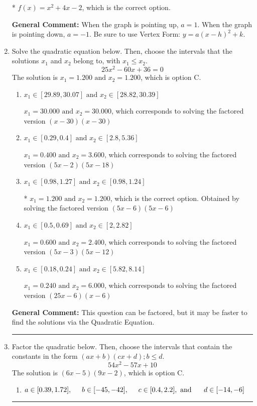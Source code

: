 \documentclass{extbook}[14pt]
\newcommand{\litem}[1]{\item #1

\rule{\textwidth}{0.4pt}}
\begin{document}
\begin{enumerate}
{\begin{enumerate}[label=\Alph*.]
* $f(x)=x^{2} +4 x -2$, which is the correct option.
\end{enumerate}

\textbf{General Comment:} When the graph is pointing up, $a=1$. When the graph is pointing down, $a=-1$. Be sure to use Vertex Form: $y = a(x-h)^2+k$.
}
\litem{
Solve the quadratic equation below. Then, choose the intervals that the solutions $x_1$ and $x_2$ belong to, with $x_1 \leq x_2$.
\[ 25x^{2} -60 x + 36 = 0 \]The solution is \( x_1 = 1.200 \text{ and } x_2 = 1.200 \), which is option C.\begin{enumerate}[label=\Alph*.]
\item \( x_1 \in [29.89, 30.07] \text{ and } x_2 \in [28.82, 30.39] \)

$x_1 = 30.000 \text{ and } x_2 = 30.000$, which corresponds to solving the factored version $(x -30)(x -30)$
\item \( x_1 \in [0.29, 0.4] \text{ and } x_2 \in [2.8, 5.36] \)

$x_1 = 0.400 \text{ and } x_2 = 3.600$, which corresponds to solving the factored version $(5x -2)(5x -18)$
\item \( x_1 \in [0.98, 1.27] \text{ and } x_2 \in [0.98, 1.24] \)

* $x_1 = 1.200 \text{ and } x_2 = 1.200$, which is the correct option. Obtained by solving the factored version $(5x -6)(5x -6)$
\item \( x_1 \in [0.5, 0.69] \text{ and } x_2 \in [2, 2.82] \)

$x_1 = 0.600 \text{ and } x_2 = 2.400$, which corresponds to solving the factored version $(5x -3)(5x -12)$
\item \( x_1 \in [0.18, 0.24] \text{ and } x_2 \in [5.82, 8.14] \)

$x_1 = 0.240 \text{ and } x_2 = 6.000$, which corresponds to solving the factored version $(25x -6)(x -6)$
\end{enumerate}

\textbf{General Comment:} This question can be factored, but it may be faster to find the solutions via the Quadratic Equation.
}
\litem{
Factor the quadratic below. Then, choose the intervals that contain the constants in the form $(ax+b)(cx+d); b \leq d.$
\[ 54x^{2} -57 x + 10 \]The solution is \( (6x -5)(9x -2) \), which is option C.\begin{enumerate}[label=\Alph*.]
\item \( a \in [0.39, 1.72], \hspace*{5mm} b \in [-45, -42], \hspace*{5mm} c \in [0.4, 2.2], \text{ and } \hspace*{5mm} d \in [-14, -6] \)


\end{enumerate}}
\end{enumerate}
\end{document}
